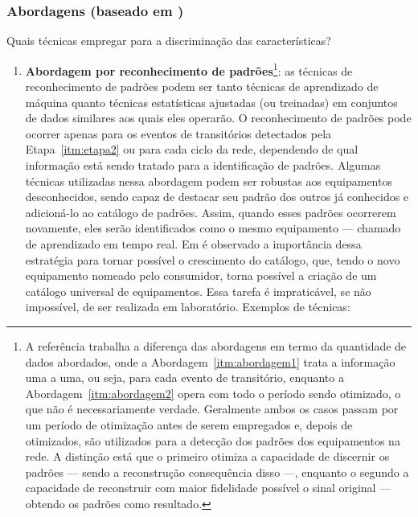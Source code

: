 \subsubsection[Abordagens]{Abordagens (baseado em
\cite{nilm_liang_pt1_2010_34,nilm_zeifman_review_2011})}
\label{top:abordagens}

Quais técnicas empregar para a discriminação das características?

\begin{enumerate}[label={Abordagem} \arabic* - ,ref=\arabic*,align=left]
\item\label{itm:abordagem1}\textbf{Abordagem por reconhecimento de
padrões}\footnote{A referência \cite{nilm_zeifman_review_2011}
trabalha a diferença das abordagens em termo da quantidade de dados
abordados, onde a Abordagem~\ref{itm:abordagem1} trata a informação
uma a uma, ou seja, para cada evento de transitório, enquanto a
Abordagem~\ref{itm:abordagem2} opera com todo o período sendo
otimizado, o que não é necessariamente verdade. Geralmente ambos os casos passam
por um período de otimização antes de serem empregados e, depois de
otimizados, são utilizados para a detecção dos padrões dos equipamentos
na rede. A distinção está que o primeiro otimiza a capacidade de
discernir os padrões --- sendo a reconstrução consequência disso ---,
enquanto o segundo a capacidade de reconstruir com maior fidelidade
possível o sinal original --- obtendo os padrões como
resultado.\label{fn:diff_abordagens}}: as técnicas de reconhecimento
de padrões podem ser tanto técnicas de aprendizado de máquina quanto
técnicas estatísticas ajustadas (ou treinadas) em conjuntos de dados similares
aos quais eles operarão. O reconhecimento de padrões pode ocorrer
apenas para os eventos de transitórios detectados pela
Etapa~\ref{itm:etapa2} ou para cada ciclo da rede, dependendo de qual
informação está sendo tratado para a
identificação de padrões. Algumas técnicas utilizadas nessa abordagem
podem ser robustas aos equipamentos desconhecidos, sendo capaz de
destacar seu padrão dos outros já conhecidos e adicioná-lo ao catálogo
de padrões. Assim, quando esses padrões ocorrerem novamente, eles
serão identificados como o mesmo equipamento --- chamado de aprendizado
em tempo real. Em \cite{nilm_matthews_overview_2008_22} é observado a
importância dessa estratégia para tornar possível o crescimento do
catálogo, que, tendo o novo equipamento nomeado pelo consumidor, torna
possível a criação de um catálogo universal de equipamentos. Essa
tarefa é impraticável, se não impossível, de ser realizada em
laboratório. Exemplos de técnicas:

\end{enumerate}
